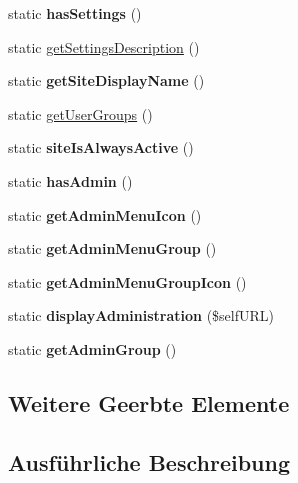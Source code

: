 \begin{DoxyCompactItemize}
\mbox{\label{classupdatevplan_a5c955fbeb6783d718140fe8ee7ef8b4a}} 
static {\bfseries has\+Settings} ()
\item 
static \mbox{\hyperlink{classupdatevplan_a43077a61ec1f3283f898e63baf0853cd}{get\+Settings\+Description}} ()
\item 
\mbox{\label{classupdatevplan_a169af4069cdbaad762b6b3c28a50f593}} 
static {\bfseries get\+Site\+Display\+Name} ()
\item 
static \mbox{\hyperlink{classupdatevplan_a45d93d2df17784033ec72a19546ccaac}{get\+User\+Groups}} ()
\item 
\mbox{\label{classupdatevplan_a9f5728ec03226a4b4f5291f5cd981b52}} 
static {\bfseries site\+Is\+Always\+Active} ()
\item 
\mbox{\label{classupdatevplan_a6ea652952c933ce5df456140944a9b00}} 
static {\bfseries has\+Admin} ()
\item 
\mbox{\label{classupdatevplan_adb71e6064c5d27e2bddf17ac65d21475}} 
static {\bfseries get\+Admin\+Menu\+Icon} ()
\item 
\mbox{\label{classupdatevplan_a46af413816005f7aa1cd8630ad7a700b}} 
static {\bfseries get\+Admin\+Menu\+Group} ()
\item 
\mbox{\label{classupdatevplan_a1c9dc5b8be68d52f874fdbd82f147573}} 
static {\bfseries get\+Admin\+Menu\+Group\+Icon} ()
\item 
\mbox{\label{classupdatevplan_aebc26615170a58aa38e5e29f8ba37ff2}} 
static {\bfseries display\+Administration} (\$self\+U\+RL)
\item 
\mbox{\label{classupdatevplan_ae6fe7f22ce95b8de8ce2c0eba8b47e62}} 
static {\bfseries get\+Admin\+Group} ()
\end{DoxyCompactItemize}
\subsection*{Weitere Geerbte Elemente}


\subsection{Ausführliche Beschreibung}



